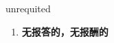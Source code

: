 
\begin{frame}
{\huge unrequited}
\begin{center}
\begin{enumerate}\Large
  \item \textbf{无报答的，无报酬的}
\end{enumerate}
\end{center}
\end{frame}
